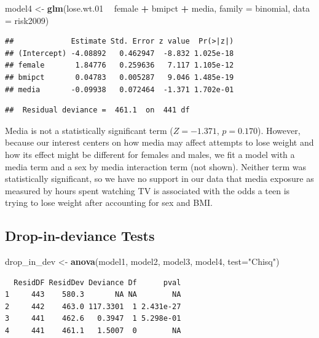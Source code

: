 \documentclass[
]{krantz}
\newenvironment{Shaded}{\begin{snugshade}}{\end{snugshade}}
\newcommand{\DataTypeTok}[1]{\textcolor[rgb]{0.27,0.27,0.27}{#1}}
\newcommand{\FloatTok}[1]{\textcolor[rgb]{0.06,0.06,0.06}{#1}}
\newcommand{\KeywordTok}[1]{\textcolor[rgb]{0.27,0.27,0.27}{\textbf{#1}}}
\newcommand{\NormalTok}[1]{#1}
\newcommand{\OperatorTok}[1]{\textcolor[rgb]{0.43,0.43,0.43}{\textbf{#1}}}
\newcommand{\StringTok}[1]{\textcolor[rgb]{0.5,0.5,0.5}{#1}}
\begin{document}
\begin{Shaded}
\begin{Highlighting}[]
\NormalTok{model4 <-}\StringTok{ }\KeywordTok{glm}\NormalTok{(lose.wt}\FloatTok{.01} \OperatorTok{~}\StringTok{ }\NormalTok{female }\OperatorTok{+}\StringTok{ }\NormalTok{bmipct }\OperatorTok{+}\StringTok{ }\NormalTok{media, }
              \DataTypeTok{family =}\NormalTok{ binomial, }\DataTypeTok{data =}\NormalTok{ risk2009)}
\end{Highlighting}
\end{Shaded}

\begin{verbatim}
##             Estimate Std. Error z value  Pr(>|z|)
## (Intercept) -4.08892   0.462947  -8.832 1.025e-18
## female       1.84776   0.259636   7.117 1.105e-12
## bmipct       0.04783   0.005287   9.046 1.485e-19
## media       -0.09938   0.072464  -1.371 1.702e-01
\end{verbatim}

\begin{verbatim}
##  Residual deviance =  461.1  on  441 df
\end{verbatim}

Media is not a statistically significant term (\(Z=-1.371\), \(p=0.170\)). However, because our interest centers on how media may affect attempts to lose weight and how its effect might be different for females and males, we fit a model with a media term and a sex by media interaction term (not shown). Neither term was statistically significant, so we have no support in our data that media exposure as measured by hours spent watching TV is associated with the odds a teen is trying to lose weight after accounting for sex and BMI.

\hypertarget{drop-in-deviance-tests}{%
\subsection{Drop-in-deviance Tests}\label{drop-in-deviance-tests}}

\begin{Shaded}
\begin{Highlighting}[]
\NormalTok{drop_in_dev <-}\StringTok{ }\KeywordTok{anova}\NormalTok{(model1, model2, model3, model4,}
                     \DataTypeTok{test=}\StringTok{"Chisq"}\NormalTok{)}
\end{Highlighting}
\end{Shaded}

\begin{verbatim}
  ResidDF ResidDev Deviance Df      pval
1     443    580.3       NA NA        NA
2     442    463.0 117.3301  1 2.431e-27
3     441    462.6   0.3947  1 5.298e-01
4     441    461.1   1.5007  0        NA
\end{verbatim}
\end{document}
